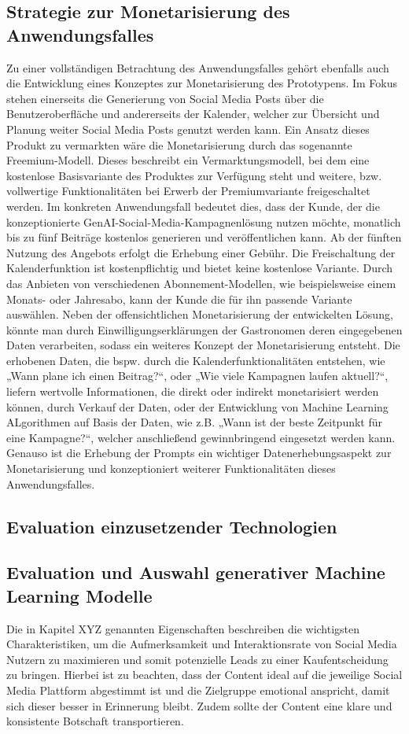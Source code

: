 \subsection{Strategie zur Monetarisierung des Anwendungsfalles}
Zu einer vollständigen Betrachtung des Anwendungsfalles gehört ebenfalls auch die Entwicklung eines Konzeptes zur Monetarisierung des Prototypens.
Im Fokus stehen einerseits die Generierung von Social Media Posts über die Benutzeroberfläche und andererseits der Kalender, welcher zur Übersicht und Planung weiter Social Media Posts genutzt werden kann.
Ein Ansatz dieses Produkt zu vermarkten wäre die Monetarisierung durch das sogenannte Freemium-Modell.
Dieses beschreibt ein Vermarktungsmodell, bei dem eine kostenlose Basisvariante des Produktes zur Verfügung steht und weitere, bzw. vollwertige Funktionalitäten bei Erwerb der Premiumvariante freigeschaltet werden.
Im konkreten Anwendungsfall bedeutet dies, dass der Kunde, der die konzeptionierte GenAI-Social-Media-Kampagnenlösung nutzen möchte, monatlich bis zu fünf Beiträge kostenlos generieren und veröffentlichen kann.
Ab der fünften Nutzung des Angebots erfolgt die Erhebung einer Gebühr.
Die Freischaltung der Kalenderfunktion ist kostenpflichtig und bietet keine kostenlose Variante.
Durch das Anbieten von verschiedenen Abonnement-Modellen, wie beispielsweise einem Monats- oder Jahresabo, kann der Kunde die für ihn passende Variante auswählen.
Neben der offensichtlichen Monetarisierung der entwickelten Lösung, könnte man durch Einwilligungserklärungen der Gastronomen deren eingegebenen Daten verarbeiten, sodass ein weiteres Konzept der Monetarisierung entsteht.
Die erhobenen Daten, die bspw. durch die Kalenderfunktionalitäten entstehen, wie „Wann plane ich einen Beitrag?“, oder „Wie viele Kampagnen laufen aktuell?“, liefern wertvolle Informationen, die direkt oder indirekt monetarisiert werden können, durch Verkauf der Daten, oder der Entwicklung von Machine Learning ALgorithmen auf Basis der Daten, wie z.B. „Wann ist der beste Zeitpunkt für eine Kampagne?“, welcher anschließend gewinnbringend eingesetzt werden kann.
Genauso ist die Erhebung der Prompts ein wichtiger Datenerhebungsaspekt zur Monetarisierung und konzeptioniert weiterer Funktionalitäten dieses Anwendungsfalles.


\subsection{Evaluation einzusetzender Technologien}

\subsection{Evaluation und Auswahl generativer Machine Learning Modelle} %
Die in Kapitel XYZ genannten Eigenschaften beschreiben die wichtigsten Charakteristiken, um die Aufmerksamkeit und Interaktionsrate von Social Media Nutzern zu maximieren und somit potenzielle Leads zu einer Kaufentscheidung zu bringen.
Hierbei ist zu beachten, dass der Content ideal auf die jeweilige Social Media Plattform abgestimmt ist und die Zielgruppe emotional anspricht, damit sich dieser besser in Erinnerung bleibt.
Zudem sollte der Content eine klare und konsistente Botschaft transportieren.

